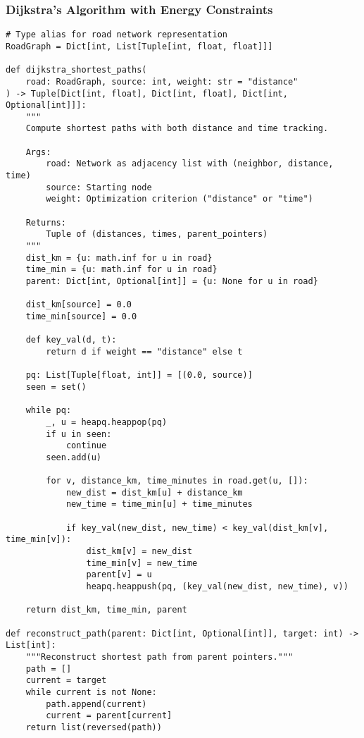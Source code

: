 \documentclass[12pt,a4paper]{article}
\begin{document}
\subsubsection{Dijkstra's Algorithm with Energy Constraints}

\begin{lstlisting}[caption=Energy-Constrained Shortest Path Algorithm]
# Type alias for road network representation
RoadGraph = Dict[int, List[Tuple[int, float, float]]]

def dijkstra_shortest_paths(
    road: RoadGraph, source: int, weight: str = "distance"
) -> Tuple[Dict[int, float], Dict[int, float], Dict[int, Optional[int]]]:
    """
    Compute shortest paths with both distance and time tracking.
    
    Args:
        road: Network as adjacency list with (neighbor, distance, time)
        source: Starting node
        weight: Optimization criterion ("distance" or "time")
    
    Returns:
        Tuple of (distances, times, parent_pointers)
    """
    dist_km = {u: math.inf for u in road}
    time_min = {u: math.inf for u in road}
    parent: Dict[int, Optional[int]] = {u: None for u in road}
    
    dist_km[source] = 0.0
    time_min[source] = 0.0
    
    def key_val(d, t):
        return d if weight == "distance" else t
    
    pq: List[Tuple[float, int]] = [(0.0, source)]
    seen = set()
    
    while pq:
        _, u = heapq.heappop(pq)
        if u in seen:
            continue
        seen.add(u)
        
        for v, distance_km, time_minutes in road.get(u, []):
            new_dist = dist_km[u] + distance_km
            new_time = time_min[u] + time_minutes
            
            if key_val(new_dist, new_time) < key_val(dist_km[v], time_min[v]):
                dist_km[v] = new_dist
                time_min[v] = new_time
                parent[v] = u
                heapq.heappush(pq, (key_val(new_dist, new_time), v))
    
    return dist_km, time_min, parent

def reconstruct_path(parent: Dict[int, Optional[int]], target: int) -> List[int]:
    """Reconstruct shortest path from parent pointers."""
    path = []
    current = target
    while current is not None:
        path.append(current)
        current = parent[current]
    return list(reversed(path))
\end{lstlisting}
\end{document}
